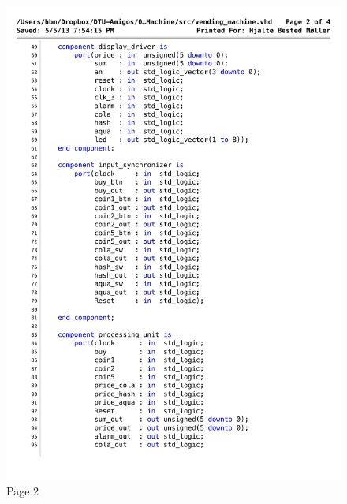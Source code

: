 \begin{figure}[!h]
\centering
\includegraphics[scale=0.6]{figs/vending_machine_2.pdf}
\caption{Page 2}
\label{vhd:vending2}
\end{figure}

